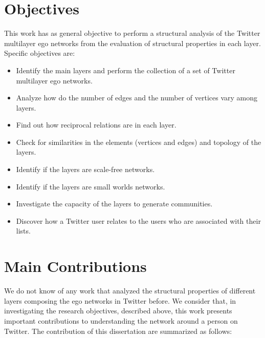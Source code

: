 

\section{Objectives}
\label{sec:objectives}
This work has as general objective to perform a structural analysis of the Twitter multilayer ego networks from the evaluation of structural properties in each layer. Specific objectives are:

\begin{itemize}
    \item Identify the main layers and perform the collection of a set of Twitter multilayer ego networks.
    \item Analyze how do the number of edges and the number of vertices vary among layers.
    \item Find out how reciprocal relations are in each layer.
    \item Check for similarities in the elements (vertices and edges) and topology of the layers.
    \item Identify if the layers are scale-free networks.
    \item Identify if the layers are small worlds networks.
    \item Investigate the capacity of the layers to generate communities.
    \item Discover how a Twitter user relates to the users who are associated with their lists.
\end{itemize}




\section{Main Contributions}
\label{sec:contributions}
We do not know of any work that analyzed the structural properties of different layers composing the ego networks in Twitter before. We consider that, in investigating the research objectives, described above, this work presents important contributions to understanding the network around a person on Twitter. The contribution of this dissertation are summarized as follows:

